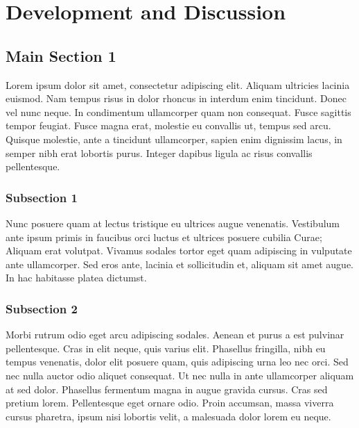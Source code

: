 
\chapter{Development and Discussion} %

\label{Chapter4} %


\section{Main Section 1}

Lorem ipsum dolor sit amet, consectetur adipiscing elit. Aliquam ultricies lacinia euismod. Nam tempus risus in dolor rhoncus in interdum enim tincidunt. Donec vel nunc neque. In condimentum ullamcorper quam non consequat. Fusce sagittis tempor feugiat. Fusce magna erat, molestie eu convallis ut, tempus sed arcu. Quisque molestie, ante a tincidunt ullamcorper, sapien enim dignissim lacus, in semper nibh erat lobortis purus. Integer dapibus ligula ac risus convallis pellentesque.

\subsection{Subsection 1}

Nunc posuere quam at lectus tristique eu ultrices augue venenatis. Vestibulum ante ipsum primis in faucibus orci luctus et ultrices posuere cubilia Curae; Aliquam erat volutpat. Vivamus sodales tortor eget quam adipiscing in vulputate ante ullamcorper. Sed eros ante, lacinia et sollicitudin et, aliquam sit amet augue. In hac habitasse platea dictumst.


\subsection{Subsection 2}
Morbi rutrum odio eget arcu adipiscing sodales. Aenean et purus a est pulvinar pellentesque. Cras in elit neque, quis varius elit. Phasellus fringilla, nibh eu tempus venenatis, dolor elit posuere quam, quis adipiscing urna leo nec orci. Sed nec nulla auctor odio aliquet consequat. Ut nec nulla in ante ullamcorper aliquam at sed dolor. Phasellus fermentum magna in augue gravida cursus. Cras sed pretium lorem. Pellentesque eget ornare odio. Proin accumsan, massa viverra cursus pharetra, ipsum nisi lobortis velit, a malesuada dolor lorem eu neque.

